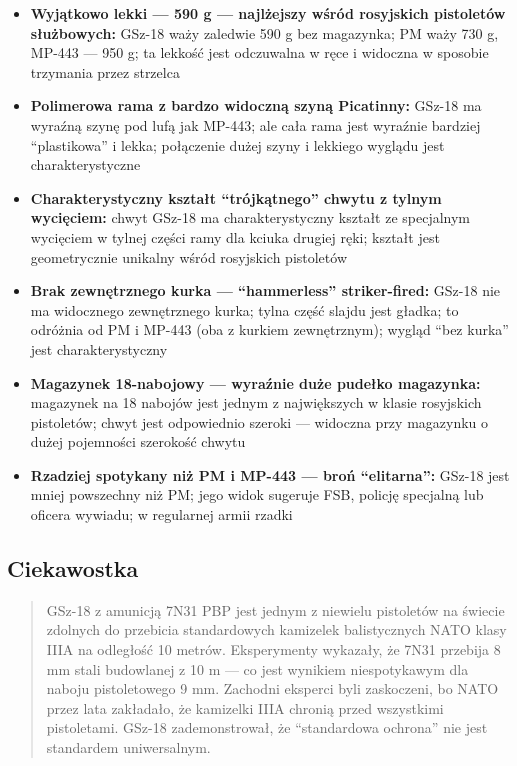 \documentclass[12pt,oneside]{book}
\providecommand{\tightlist}{%
  \setlength{\itemsep}{0pt}\setlength{\parskip}{0pt}}
\begin{document}
\begin{itemize}
\tightlist
\item
  \textbf{Wyjątkowo lekki --- 590 g --- najlżejszy wśród rosyjskich
  pistoletów służbowych:} GSz-18 waży zaledwie 590 g bez magazynka; PM
  waży 730 g, MP-443 --- 950 g; ta lekkość jest odczuwalna w ręce i
  widoczna w sposobie trzymania przez strzelca
\item
  \textbf{Polimerowa rama z bardzo widoczną szyną Picatinny:} GSz-18 ma
  wyraźną szynę pod lufą jak MP-443; ale cała rama jest wyraźnie
  bardziej ``plastikowa'' i lekka; połączenie dużej szyny i lekkiego
  wyglądu jest charakterystyczne
\item
  \textbf{Charakterystyczny kształt ``trójkątnego'' chwytu z tylnym
  wycięciem:} chwyt GSz-18 ma charakterystyczny kształt ze specjalnym
  wycięciem w tylnej części ramy dla kciuka drugiej ręki; kształt jest
  geometrycznie unikalny wśród rosyjskich pistoletów
\item
  \textbf{Brak zewnętrznego kurka --- ``hammerless'' striker-fired:}
  GSz-18 nie ma widocznego zewnętrznego kurka; tylna część slajdu jest
  gładka; to odróżnia od PM i MP-443 (oba z kurkiem zewnętrznym); wygląd
  ``bez kurka'' jest charakterystyczny
\item
  \textbf{Magazynek 18-nabojowy --- wyraźnie duże pudełko magazynka:}
  magazynek na 18 nabojów jest jednym z największych w klasie rosyjskich
  pistoletów; chwyt jest odpowiednio szeroki --- widoczna przy magazynku
  o dużej pojemności szerokość chwytu
\item
  \textbf{Rzadziej spotykany niż PM i MP-443 --- broń ``elitarna'':}
  GSz-18 jest mniej powszechny niż PM; jego widok sugeruje FSB, policję
  specjalną lub oficera wywiadu; w regularnej armii rzadki
\end{itemize}

\subsection{Ciekawostka}\label{ciekawostka-107}

\begin{quote}
GSz-18 z amunicją 7N31 PBP jest jednym z niewielu pistoletów na świecie
zdolnych do przebicia standardowych kamizelek balistycznych NATO klasy
IIIA na odległość 10 metrów. Eksperymenty wykazały, że 7N31 przebija 8
mm stali budowlanej z 10 m --- co jest wynikiem niespotykawym dla naboju
pistoletowego 9 mm. Zachodni eksperci byli zaskoczeni, bo NATO przez
lata zakładało, że kamizelki IIIA chronią przed wszystkimi pistoletami.
GSz-18 zademonstrował, że ``standardowa ochrona'' nie jest standardem
uniwersalnym.
\end{quote}
\end{document}
